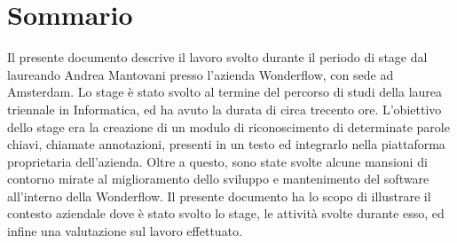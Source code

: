 \cleardoublepage
{}
\chapter*{Sommario}
\thispagestyle{empty}
Il presente documento descrive il lavoro svolto durante il periodo di stage dal
laureando Andrea Mantovani presso l’azienda Wonderflow, con sede ad Amsterdam.
Lo stage è stato svolto al termine del percorso di studi della laurea triennale
in Informatica, ed ha avuto la durata di circa trecento ore.
L’obiettivo dello stage era la creazione di un modulo di riconoscimento di
determinate parole chiavi, chiamate annotazioni, presenti in un testo ed
integrarlo nella piattaforma proprietaria dell'azienda. Oltre a questo, sono
state svolte alcune mansioni di contorno mirate al miglioramento dello sviluppo
e mantenimento del software all'interno della Wonderflow.
Il presente documento ha lo scopo di illustrare il contesto aziendale dove è
stato svolto lo stage, le attività svolte durante esso, ed infine una
valutazione sul lavoro effettuato.
\bigskip
